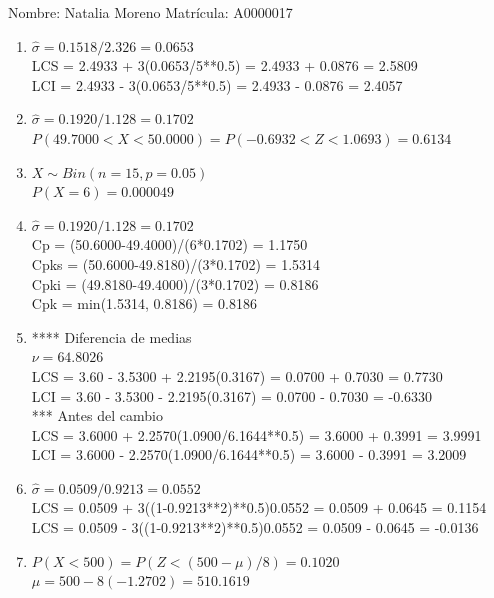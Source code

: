 \documentclass[8pt]{report}
\begin{document}
 \newpage

Nombre: \underline{\hspace*{.2in}}
Natalia Moreno
\underline{\hspace*{.2in}} \quad Matr\'icula:\underline{\hspace*{.2in}}
A0000017
\underline{\hspace*{.2in}} \\

\begin{enumerate}
\item $\hat\sigma = 0.1518/2.326 = 0.0653$\\
LCS = 2.4933 + 3(0.0653/5**0.5) = 2.4933 + 0.0876 = 2.5809\\
LCI = 2.4933 - 3(0.0653/5**0.5) = 2.4933 - 0.0876 = 2.4057
\item $\hat\sigma = 0.1920/1.128 = 0.1702$\\
$P(49.7000 < X < 50.0000) = P(-0.6932 < Z < 1.0693) = 0.6134$\\
\item $X \sim Bin(n=15, p=0.05)$\\
$P(X = 6) = 0.000049$
\item $\hat\sigma = 0.1920/1.128 = 0.1702$\\
Cp = (50.6000-49.4000)/(6*0.1702) = 1.1750\\
Cpks = (50.6000-49.8180)/(3*0.1702) = 1.5314\\
Cpki = (49.8180-49.4000)/(3*0.1702) = 0.8186\\
Cpk = min(1.5314, 0.8186) = 0.8186
\item **** Diferencia de medias\\
$\nu = 64.8026$\\
LCS = 3.60 - 3.5300 + 2.2195(0.3167) = 0.0700 + 0.7030 = 0.7730\\
LCI = 3.60 - 3.5300 - 2.2195(0.3167) = 0.0700 - 0.7030 = -0.6330\\
*** Antes del cambio\\
LCS = 3.6000 + 2.2570(1.0900/6.1644**0.5) = 3.6000 + 0.3991 = 3.9991\\
LCI = 3.6000 - 2.2570(1.0900/6.1644**0.5) = 3.6000 - 0.3991 = 3.2009\\
\item $\hat\sigma = 0.0509/0.9213 = 0.0552$\\
LCS = 0.0509 + 3((1-0.9213**2)**0.5)0.0552 = 0.0509 + 0.0645 = 0.1154\\
LCS = 0.0509 - 3((1-0.9213**2)**0.5)0.0552 = 0.0509 - 0.0645 = -0.0136
\item $P(X < 500) = P(Z < (500-\mu)/8) = 0.1020$\\
$\mu = 500 - 8(-1.2702) = 510.1619$\\
\end{enumerate}
\end{document}
